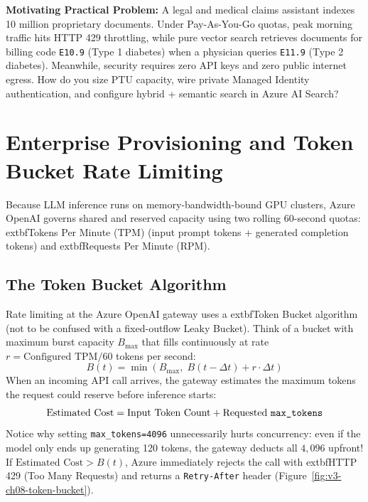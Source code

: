 \begin{chaptergoalsbox}
\textbf{Motivating Practical Problem:}
A legal and medical claims assistant indexes 10 million proprietary documents. Under Pay-As-You-Go quotas, peak morning traffic hits HTTP 429 throttling, while pure vector search retrieves documents for billing code \texttt{E10.9} (Type 1 diabetes) when a physician queries \texttt{E11.9} (Type 2 diabetes). Meanwhile, security requires zero API keys and zero public internet egress. How do you size PTU capacity, wire private Managed Identity authentication, and configure hybrid + semantic search in Azure AI Search?
\end{chaptergoalsbox}

\section{Enterprise Provisioning and Token Bucket Rate Limiting}

Because LLM inference runs on memory-bandwidth-bound GPU clusters, Azure OpenAI governs shared and reserved capacity using two rolling 60-second quotas: 	extbf{Tokens Per Minute (TPM)} (input prompt tokens + generated completion tokens) and 	extbf{Requests Per Minute (RPM)}.

\subsection{The Token Bucket Algorithm}
Rate limiting at the Azure OpenAI gateway uses a 	extbf{Token Bucket} algorithm (not to be confused with a fixed-outflow Leaky Bucket). Think of a bucket with maximum burst capacity $B_{\max}$ that fills continuously at rate $r = \text{Configured TPM} / 60$ tokens per second:
\begin{equation}
B(t) = \min\left( B_{\max},\; B(t-\Delta t) + r \cdot \Delta t \right)
\end{equation}
When an incoming API call arrives, the gateway estimates the maximum tokens the request could reserve before inference starts:
\begin{equation}
\text{Estimated Cost} = \text{Input Token Count} + \text{Requested \texttt{max\_tokens}}
\end{equation}
Notice why setting \texttt{max\_tokens=4096} unnecessarily hurts concurrency: even if the model only ends up generating 120 tokens, the gateway deducts all $4{,}096$ upfront! If $\text{Estimated Cost} > B(t)$, Azure immediately rejects the call with 	extbf{HTTP 429 (Too Many Requests)} and returns a \texttt{Retry-After} header (Figure~\ref{fig:v3-ch08-token-bucket}).

